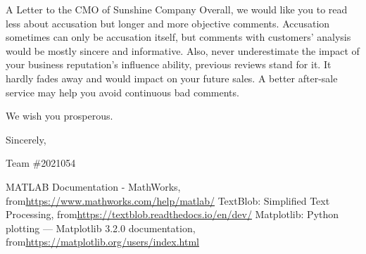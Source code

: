 \documentclass[12pt]{article}  %
\begin{document}
\begin{letter}{A Letter to the CMO of Sunshine Company}
​Overall, we would like you to read less about accusation but longer and more objective comments. Accusation sometimes can only be accusation itself, but comments with customers' analysis would be mostly sincere and informative. Also, never underestimate the impact of your business reputation’s influence ability, previous reviews stand for it. It hardly fades away and would impact on your future sales. A better after-sale service may help you avoid continuous bad comments.

​We wish you prosperous.

\begin{flushright}
 Sincerely,

Team \#2021054

\end{flushright}
\end{letter}


\begin{thebibliography}{99}
 MATLAB Documentation - MathWorks, from\url{https://www.mathworks.com/help/matlab/}
 TextBlob: Simplified Text Processing, from\url{https://textblob.readthedocs.io/en/dev/}
 Matplotlib: Python plotting — Matplotlib 3.2.0 documentation, from\url{https://matplotlib.org/users/index.html}

\end{thebibliography}
\end{document}
